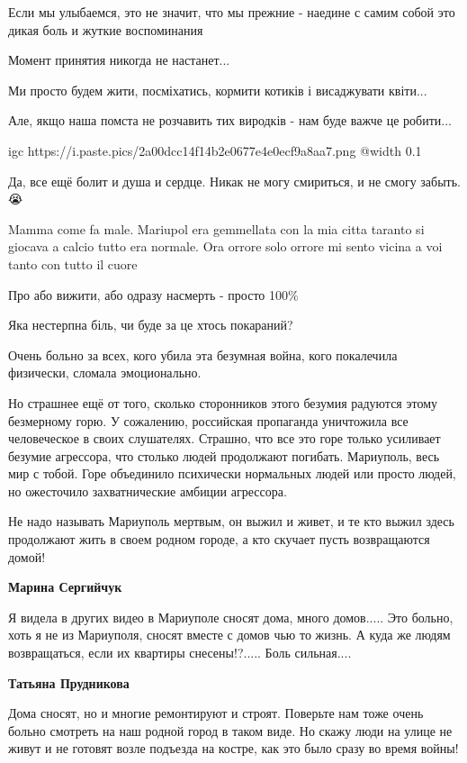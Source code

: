 
Если мы улыбаемся, это не значит, что мы прежние - наедине с самим собой это
дикая боль и жуткие воспоминания


Момент принятия никогда не настанет...

Ми просто будем жити, посміхатись, кормити котиків і висаджувати квіти...

Але, якщо наша помста не розчавить тих виродків - нам буде важче це робити...


\ifcmt
  igc https://i.paste.pics/2a00dcc14f14b2e0677e4e0ecf9a8aa7.png
	@width 0.1
\fi


Да, все ещё болит и душа и сердце. Никак не могу смириться, и не смогу
забыть.😭


Mamma come fa male. Mariupol era gemmellata con la mia citta taranto si giocava
a calcio tutto era normale. Ora orrore solo orrore mi sento vicina a voi tanto
con tutto il cuore


Про або вижити, або одразу насмерть - просто 100\%


Яка нестерпна біль, чи буде за це хтось покараний?


Очень больно за всех, кого убила эта безумная война, кого покалечила физически, сломала эмоционально.

Но страшнее ещё от того, сколько сторонников этого безумия радуются этому
безмерному горю. У сожалению, российская пропаганда уничтожила все человеческое
в своих слушателях. Страшно, что все это горе только усиливает безумие
агрессора, что столько людей продолжают погибать.  Мариуполь, весь мир с тобой.
Горе объединило психически нормальных людей или просто людей, но ожесточило
захватнические амбиции агрессора.


Не надо называть Мариуполь мертвым, он выжил и живет, и те кто выжил здесь
продолжают жить в своем родном городе, а кто скучает пусть возвращаются домой!

\begin{itemize} %
\textbf{Марина Сергийчук} 

Я видела в других видео в Мариуполе сносят дома, много домов..... Это больно,
хоть я не из Мариуполя, сносят вместе с домов чью то жизнь. А куда же людям
возвращаться, если их квартиры снесены!?..... Боль сильная....

\textbf{Татьяна Прудникова} 

Дома сносят, но и многие ремонтируют и строят. Поверьте нам тоже очень больно
смотреть на наш родной город в таком виде. Но скажу люди на улице не живут и не
готовят возле подъезда на костре, как это было сразу во время войны!

\end{itemize} %

